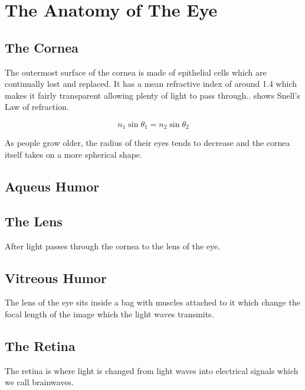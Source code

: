 
\chapter{The Anatomy of The Eye}

\label{anatomy} %


\section{The Cornea}


The outermost surface of the cornea is made of epithelial cells which are continually lost and replaced.\cite{jester1999cellular,hassell2010molecular} It has a mean refractive index of around 1.4 which makes it fairly transparent allowing plenty of light to pass through.\cite{thoft1983x, patel1994refractive}.  shows Snell's Law of refraction.

\begin{equation}
n_1\sin\theta_1=n_2\sin\theta_2
\label{eq:refractive}
\end{equation}


As people grow older, the radius of their eyes tends to decrease and the cornea itself takes on a more spherical shape.\cite{guirao2000optical}

\section{Aqueus Humor}

\section{The Lens}
After light passes through the cornea to the lens of the eye.

\section{Vitreous Humor}

The lens of the eye sits inside a bag with muscles attached to it which change
the focal length of the image which the light waves transmits.

\section{The Retina}
The retina is where light is changed from light waves into electrical signals
which we call brainwaves.

